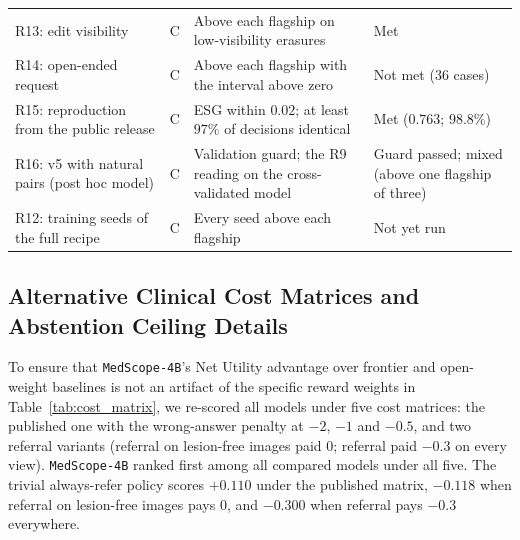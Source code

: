 \documentclass[5p,times,twocolumn,authoryear]{elsarticle}
\begin{document}
\begin{table}[!htbp]
\begin{center}
\begin{adjustbox}{max width=\linewidth}
\begin{tabular}{L{4.6cm}cL{5.2cm}L{6.0cm}}
R13: edit visibility & C & Above each flagship on low-visibility erasures & Met \\
R14: open-ended request & C & Above each flagship with the interval above zero & Not met ($36$ cases) \\
R15: reproduction from the public release & C & ESG within $0.02$; at least $97\%$ of decisions identical & Met ($0.763$; $98.8\%$) \\
R16: v5 with natural pairs (post hoc model) & C & Validation guard; the R9 reading on the cross-validated model & Guard passed; mixed (above one flagship of three) \\
R12: training seeds of the full recipe & C & Every seed above each flagship & Not yet run \\
\bottomrule
\end{tabular}
\end{adjustbox}
\end{center}
\end{table}

\subsection{Alternative Clinical Cost Matrices and Abstention Ceiling Details}
To ensure that \texttt{MedScope-4B}'s Net Utility advantage over frontier and open-weight baselines is not an artifact of the specific reward weights in Table~\ref{tab:cost_matrix}, we re-scored all models under five cost matrices: the published one with the wrong-answer penalty at $-2$, $-1$ and $-0.5$, and two referral variants (referral on lesion-free images paid $0$; referral paid $-0.3$ on every view). \texttt{MedScope-4B} ranked first among all compared models under all five. The trivial always-refer policy scores $+0.110$ under the published matrix, $-0.118$ when referral on lesion-free images pays $0$, and $-0.300$ when referral pays $-0.3$ everywhere.
\end{document}
